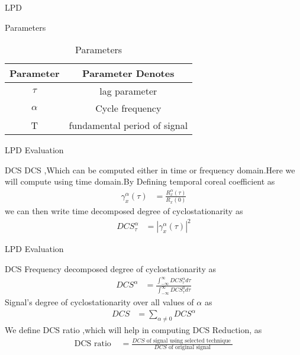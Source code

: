 \documentclass{beamer}
\begin{document}
\begin{frame}{LPD}
\begin{block}{Parameters}
\begin{table}[]
\centering
\renewcommand{\arraystretch}{1.4}
\begin{tabular}{|c|c|}
        \hline
        Parameter& Parameter Denotes \\ \hline
        $\tau$ & lag parameter \\ \hline
        $\alpha$ & Cycle frequency\\ \hline
        T & fundamental period of signal \\ \hline
\end{tabular}
\caption{Parameters}
\label{tab:my_label1}
\end{table}
\end{block}
\end{frame}



\begin{frame}{LPD Evaluation }
\begin{block}{DCS}
        DCS ,Which can be computed either in time or frequency domain.Here we will compute using time domain.By Defining temporal coreal coefficient as
\begin{align}
     \gamma_{x}^{\alpha}(\tau) & = \frac{R_{x}^{\alpha}(\tau)}{R_{x}(0)}
     \label{eq7}
\end{align}
we can then write time decomposed degree of cyclostationarity as
\begin{align}
    DCS_{\tau}^{\alpha} & = |\gamma_{x}^{\alpha}(\tau)|^{2} 
   \label{eq8}
\end{align}
\end{block}
\end{frame}

\begin{frame}{LPD Evaluation }
\begin{block}{DCS}
    Frequency decomposed degree of cyclostationarity as
\begin{align}
    DCS^{\alpha} & = \frac{\int_{-\infty}^{\infty} DCS_{\tau}^{\alpha} d\tau}{\int_{-\infty}^{\infty} DCS_{\tau}^{0} d\tau}
    \label{eq9}
\end{align}
    Signal's degree of cyclostationarity over all values of $ \alpha $
    as
\begin{align}
    DCS & = \sum_{\alpha \neq 0}DCS^{\alpha}
    \label{eq10}
\end{align}
     We  define DCS ratio ,which will help in computing DCS Reduction, as
\begin{align}
    \text{DCS ratio }&= \frac{DCS \text { of signal using selected technique }}{DCS \text{ of original signal} }
    \label{eq11}
\end{align}
\end{block}
\end{frame}
\end{document}
